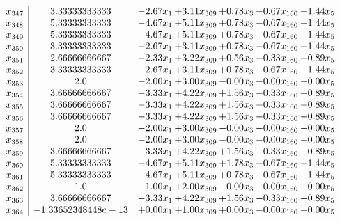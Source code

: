 \documentclass[8pt]{article}
\begin{document}
\[\begin{array}{c| c c@{\hskip 2pt} c@{\hskip 2pt} c@{\hskip 2pt} c@{\hskip 2pt} c@{\hskip 2pt} }
 x_{347}   &  3.33333333333 & -2.67 x_{1} & +  3.11 x_{309} & +  0.78 x_{3} & -0.67 x_{160} & -1.44 x_{5}\\
 x_{348}   &  5.33333333333 & -4.67 x_{1} & +  5.11 x_{309} & +  0.78 x_{3} & -0.67 x_{160} & -1.44 x_{5}\\
 x_{349}   &  5.33333333333 & -4.67 x_{1} & +  5.11 x_{309} & +  0.78 x_{3} & -0.67 x_{160} & -1.44 x_{5}\\
 x_{350}   &  3.33333333333 & -2.67 x_{1} & +  3.11 x_{309} & +  0.78 x_{3} & -0.67 x_{160} & -1.44 x_{5}\\
 x_{351}   &  2.66666666667 & -2.33 x_{1} & +  3.22 x_{309} & +  0.56 x_{3} & -0.33 x_{160} & -0.89 x_{5}\\
 x_{352}   &  3.33333333333 & -2.67 x_{1} & +  3.11 x_{309} & +  0.78 x_{3} & -0.67 x_{160} & -1.44 x_{5}\\
 x_{353}   &  2.0 & -2.00 x_{1} & +  3.00 x_{309} & -0.00 x_{3} & -0.00 x_{160} & -0.00 x_{5}\\
 x_{354}   &  3.66666666667 & -3.33 x_{1} & +  4.22 x_{309} & +  1.56 x_{3} & -0.33 x_{160} & -0.89 x_{5}\\
 x_{355}   &  3.66666666667 & -3.33 x_{1} & +  4.22 x_{309} & +  1.56 x_{3} & -0.33 x_{160} & -0.89 x_{5}\\
 x_{356}   &  3.66666666667 & -3.33 x_{1} & +  4.22 x_{309} & +  1.56 x_{3} & -0.33 x_{160} & -0.89 x_{5}\\
 x_{357}   &  2.0 & -2.00 x_{1} & +  3.00 x_{309} & -0.00 x_{3} & -0.00 x_{160} & -0.00 x_{5}\\
 x_{358}   &  2.0 & -2.00 x_{1} & +  3.00 x_{309} & -0.00 x_{3} & -0.00 x_{160} & -0.00 x_{5}\\
 x_{359}   &  3.66666666667 & -3.33 x_{1} & +  4.22 x_{309} & +  1.56 x_{3} & -0.33 x_{160} & -0.89 x_{5}\\
 x_{360}   &  5.33333333333 & -4.67 x_{1} & +  5.11 x_{309} & +  1.78 x_{3} & -0.67 x_{160} & -1.44 x_{5}\\
 x_{361}   &  5.33333333333 & -4.67 x_{1} & +  5.11 x_{309} & +  0.78 x_{3} & -0.67 x_{160} & -1.44 x_{5}\\
 x_{362}   &  1.0 & -1.00 x_{1} & +  2.00 x_{309} & -0.00 x_{3} & -0.00 x_{160} & -0.00 x_{5}\\
 x_{363}   &  3.66666666667 & -3.33 x_{1} & +  4.22 x_{309} & +  1.56 x_{3} & -0.33 x_{160} & -0.89 x_{5}\\
 x_{364}   &  -1.33652348448e-13 & +  0.00 x_{1} & +  1.00 x_{309} & +  0.00 x_{3} & -0.00 x_{160} & -0.00 x_{5}\\

\end{array}\]
\end{document}
